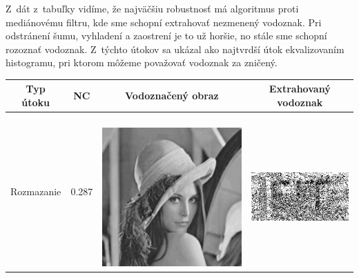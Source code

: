 Z~dát z~tabuľky vidíme, že najväčšiu robustnosť má algoritmus proti mediánovému filtru, kde sme schopní extrahovať nezmenený vodoznak. Pri odstránení šumu, vyhladení a zaostrení je to už horšie, no stále sme schopní rozoznať vodoznak. Z~týchto útokov sa ukázal ako najtvrdší útok ekvalizovaním histogramu, pri ktorom môžeme považovať vodoznak za zničený.
\begin{table}[h]
\centering
\label{enhance-table}
\begin{tabular}{llcc}
\hline
\multicolumn{1}{c}{\textbf{Typ útoku}} & \multicolumn{1}{c}{\textbf{NC}} & \multicolumn{1}{c}{\textbf{Vodoznačený obraz}} & \multicolumn{1}{c}{\textbf{Extrahovaný vodoznak}} \\ \hline
Rozmazanie                             & 0.287 &
\begin{minipage}[c]{.1\textwidth}
\ 
  \includegraphics[scale=0.1]{obrazky/blur}
\end{minipage} &
\begin{minipage}[c]{.15\textwidth}
\ 
  \includegraphics[scale=0.25]{obrazky/blur-wm}

\end{minipage}
\end{tabular}
\end{table}
